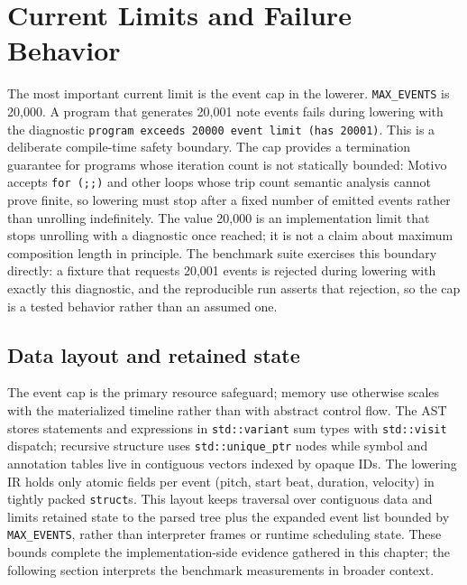 \section{Current Limits and Failure Behavior}\label{sec:limits}

The most important current limit is the event cap in the lowerer.
\texttt{MAX\_EVENTS} is 20,000.
A program that generates 20,001 note events fails during lowering with the diagnostic
\texttt{program exceeds 20000 event limit (has 20001)}.
This is a deliberate compile-time safety boundary.
The cap provides a termination guarantee for programs whose iteration count is not statically bounded: Motivo accepts
\texttt{for (;;)} and other loops whose trip count semantic analysis cannot prove finite, so lowering must stop after a
fixed number of emitted events rather than unrolling indefinitely.
The value 20{,}000 is an implementation limit that stops unrolling with a diagnostic once reached; it is not
a claim about
maximum composition length in principle.
The benchmark suite exercises this boundary directly: a fixture that requests 20{,}001 events is rejected during
lowering with exactly this diagnostic, and the reproducible run asserts that rejection, so the cap is a tested behavior
rather than an assumed one.

\subsection{Data layout and retained state}\label{detail-subsec:memory-footprint}

The event cap is the primary resource safeguard; memory use otherwise scales with the materialized timeline rather than
with abstract control flow.
The AST stores statements and expressions in \texttt{std::variant} sum types with \texttt{std::visit}
dispatch; recursive
structure uses \texttt{std::unique\_ptr} nodes while symbol and annotation tables live in contiguous vectors indexed by
opaque IDs.
The lowering IR holds only atomic fields per event (pitch, start beat, duration, velocity) in tightly packed
\texttt{struct}s.
This layout keeps traversal over contiguous data and limits retained state to the parsed tree plus the expanded event
list bounded by \texttt{MAX\_EVENTS}, rather than interpreter frames or runtime scheduling state.
These bounds complete the implementation-side evidence gathered in this chapter; the following section interprets the
benchmark measurements in broader context.
